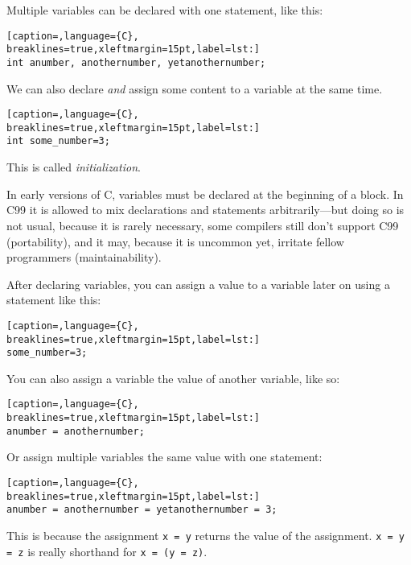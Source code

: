 Multiple variables can be declared with one statement, like this:
\lstset{basicstyle=\scriptsize, numbers=left, captionpos=b, tabsize=4}
\begin{lstlisting}[caption=,language={C},
breaklines=true,xleftmargin=15pt,label=lst:]
int anumber, anothernumber, yetanothernumber;
\end{lstlisting}

We can also declare \emph{and} assign some content to a variable at the same time.
\lstset{basicstyle=\scriptsize, numbers=left, captionpos=b, tabsize=4}
\begin{lstlisting}[caption=,language={C},
breaklines=true,xleftmargin=15pt,label=lst:]
int some_number=3;
\end{lstlisting}

This is called \emph{initialization}.

In early versions of C, variables must be declared at the beginning of a block.
In C99 it is allowed to mix declarations and statements arbitrarily—but doing
so is not usual, because it is rarely necessary, some compilers still don’t
support C99 (portability), and it may, because it is uncommon yet, irritate
fellow programmers (maintainability).

After declaring variables, you can assign a value to a variable later on using a statement like this:
\lstset{basicstyle=\scriptsize, numbers=left, captionpos=b, tabsize=4}
\begin{lstlisting}[caption=,language={C},
breaklines=true,xleftmargin=15pt,label=lst:]
some_number=3;
\end{lstlisting}

You can also assign a variable the value of another variable, like so:
\lstset{basicstyle=\scriptsize, numbers=left, captionpos=b, tabsize=4}
\begin{lstlisting}[caption=,language={C},
breaklines=true,xleftmargin=15pt,label=lst:]
anumber = anothernumber;
\end{lstlisting}

Or assign multiple variables the same value with one statement:
\lstset{basicstyle=\scriptsize, numbers=left, captionpos=b, tabsize=4}
\begin{lstlisting}[caption=,language={C},
breaklines=true,xleftmargin=15pt,label=lst:]
anumber = anothernumber = yetanothernumber = 3;
\end{lstlisting}

This is because the assignment \texttt{x = y} returns the value of the
assignment. \texttt{x = y = z} is really shorthand for \texttt{x = (y = z)}.

